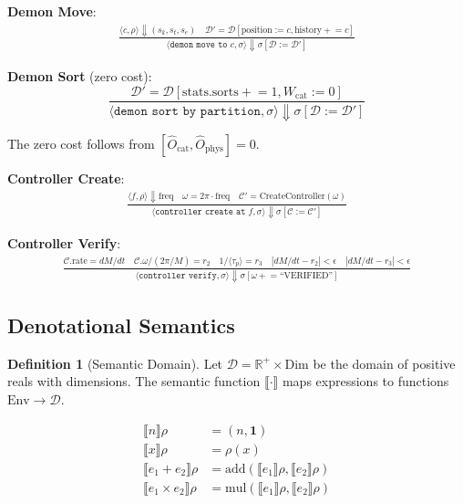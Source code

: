 \documentclass[twocolumn,10pt]{article}
\theoremstyle{definition}
\newtheorem{definition}[theorem]{Definition}
\theoremstyle{remark}
\begin{document}
\textbf{Demon Move}:
\begin{multline}
    \frac{\langle c, \rho\rangle \Downarrow (s_k, s_t, s_e) \quad \mathcal{D}' = \mathcal{D}[\text{position} := c, \text{history} \mathrel{+}= c]}{\langle\texttt{demon move to } c, \sigma\rangle \Downarrow \sigma[\mathcal{D} := \mathcal{D}']}
\end{multline}

\textbf{Demon Sort} (zero cost):
\begin{equation}
    \frac{\mathcal{D}' = \mathcal{D}[\text{stats.sorts} \mathrel{+}= 1, W_{\text{cat}} := 0]}{\langle\texttt{demon sort by partition}, \sigma\rangle \Downarrow \sigma[\mathcal{D} := \mathcal{D}']}
\end{equation}

The zero cost follows from $[\hat{O}_{\text{cat}}, \hat{O}_{\text{phys}}] = 0$.

\textbf{Controller Create}:
\begin{multline}
    \frac{\langle f, \rho\rangle \Downarrow \text{freq} \quad \omega = 2\pi \cdot \text{freq} \quad \mathcal{C}' = \text{CreateController}(\omega)}{\langle\texttt{controller create at } f, \sigma\rangle \Downarrow \sigma[\mathcal{C} := \mathcal{C}']}
\end{multline}

\textbf{Controller Verify}:
\begin{multline}
    \frac{\mathcal{C}.\text{rate} = dM/dt \quad \mathcal{C}.\omega/(2\pi/M) = r_2 \quad 1/\langle\tau_p\rangle = r_3 \quad |dM/dt - r_2| < \epsilon \quad |dM/dt - r_3| < \epsilon}{\langle\texttt{controller verify}, \sigma\rangle \Downarrow \sigma[\omega \mathrel{+}= \text{``VERIFIED''}]}
\end{multline}

\subsection{Denotational Semantics}

\begin{definition}[Semantic Domain]
Let $\mathcal{D} = \mathbb{R}^+ \times \text{Dim}$ be the domain of positive reals with dimensions. The semantic function $\llbracket\cdot\rrbracket$ maps expressions to functions $\text{Env} \to \mathcal{D}$.
\end{definition}

\begin{align}
    \llbracket n\rrbracket \rho &= (n, \mathbf{1}) \\
    \llbracket x\rrbracket \rho &= \rho(x) \\
    \llbracket e_1 + e_2\rrbracket \rho &= \text{add}(\llbracket e_1\rrbracket \rho, \llbracket e_2\rrbracket \rho) \\
    \llbracket e_1 \times e_2\rrbracket \rho &= \text{mul}(\llbracket e_1\rrbracket \rho, \llbracket e_2\rrbracket \rho)
\end{align}
\end{document}
